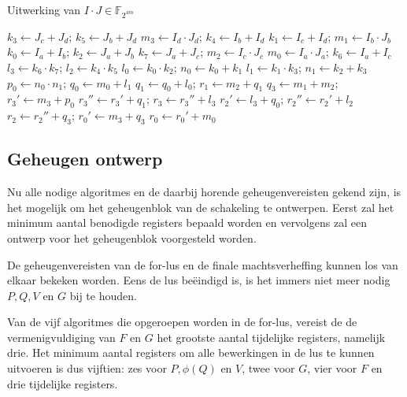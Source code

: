 
\begin{algorithm}
	\caption{Uitwerking van $I \cdot J \in \mathbb{F}_{2^{4m}}$}
	\label{algoritme-implementatie-miller-f4m-mult}
	$k_3 \leftarrow J_c + J_d$; $k_5 \leftarrow J_b + J_d$\;
	$m_3 \leftarrow I_d \cdot J_d$; $k_4 \leftarrow I_b + I_d$\;
	$k_1 \leftarrow I_c + I_d$; $m_1 \leftarrow I_b \cdot J_b$\;
	$k_0 \leftarrow I_a + I_b$; $k_2 \leftarrow J_a + J_b$\;
	$k_7 \leftarrow J_a + J_c$; $m_2 \leftarrow I_c \cdot J_c$\;
	$m_0 \leftarrow I_a \cdot J_a$; $k_6 \leftarrow I_a + I_c$\;
	$l_3 \leftarrow k_6 \cdot k_7$; $l_2 \leftarrow k_4 \cdot k_5$\;
	$l_0 \leftarrow k_0 \cdot k_2$; $n_0 \leftarrow k_0 + k_1$\;
	$l_1 \leftarrow k_1 \cdot k_3$; $n_1 \leftarrow k_2 + k_3$\;
	$p_0 \leftarrow n_0 \cdot n_1$; $q_0 \leftarrow m_0 + l_1$\;
	$q_1 \leftarrow q_0 + l_0$; $r_1 \leftarrow m_2 + q_1$\;
	$q_3 \leftarrow m_1 + m_2$; $r_3' \leftarrow m_3 + p_0$\;
	$r_3'' \leftarrow r_3' + q_1$; $r_3 \leftarrow r_3'' + l_3$\;
	$r_2' \leftarrow l_3 + q_0$; $r_2'' \leftarrow r_2' + l_2$\;
	$r_2 \leftarrow r_2'' + q_3$; $r_0' \leftarrow m_3 + q_3$\;
	$r_0 \leftarrow r_0' + m_0$\;
\end{algorithm}

\subsection{Geheugen ontwerp}

Nu alle nodige algoritmes en de daarbij horende geheugenvereisten gekend zijn, is het mogelijk om het geheugenblok van de schakeling te ontwerpen. Eerst zal het minimum aantal benodigde registers bepaald worden en vervolgens zal een ontwerp voor het geheugenblok voorgesteld worden.

De geheugenvereisten van de for-lus en de finale machtsverheffing kunnen los van elkaar bekeken worden. Eens de lus be\"eindigd is, is het immers niet meer nodig $P, Q, V$ en $G$ bij te houden.

Van de vijf algoritmes die opgeroepen worden in de for-lus, vereist de de vermenigvuldiging van $F$ en $G$ het grootste aantal tijdelijke registers, namelijk drie. Het minimum aantal registers om alle bewerkingen in de lus te kunnen uitvoeren is dus vijftien: zes voor $P, \phi(Q)$ en $V$, twee voor $G$, vier voor $F$ en drie tijdelijke registers.

